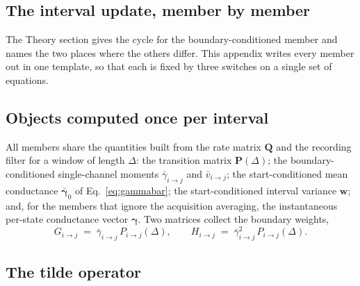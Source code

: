 \begin{appendixbox}
\section*{The interval update, member by member}

The Theory section gives the cycle for the boundary-conditioned member and names the two
places where the others differ. This appendix writes every member out in one template, so
that each is fixed by three switches on a single set of equations.

\subsection*{Objects computed once per interval}

All members share the quantities built from the rate matrix $\mathbf{Q}$ and the recording
filter for a window of length $\Delta$: the transition matrix $\mathbf{P}(\Delta)$; the
boundary-conditioned single-channel moments $\bar{\gamma}_{i\to j}$ and
$\bar{v}_{i\to j}$; the start-conditioned mean conductance $\bar{\bm{\gamma}}_0$ of
Eq.~\ref{eq:gammabar}; the start-conditioned interval variance
$\mathbf{w}$; and, for the members that ignore the acquisition
averaging, the instantaneous per-state conductance vector $\bm{\gamma}$. Two matrices
collect the boundary weights,
\begin{equation}
  G_{i\to j} \;=\; \bar{\gamma}_{i\to j}\,P_{i\to j}(\Delta),
  \qquad
  H_{i\to j} \;=\; \bar{\gamma}^2_{i\to j}\,P_{i\to j}(\Delta).
  \label{eq:GH}
\end{equation}

\subsection*{The tilde operator}


\end{appendixbox}
